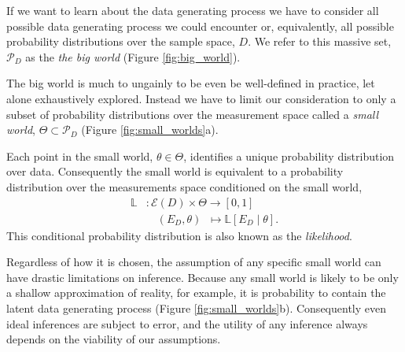 \documentclass[11pt, oneside]{article}
\newcommand{\PP}{ \mathbb{P} }
\newcommand{\EV}[1]{\ensuremath { \mathcal{E} \! \left( #1 \right)  } }
\begin{document}
If we want to learn about the data generating process we have
to consider all possible data generating process we could
encounter or, equivalently, all possible probability distributions
over the sample space, $D$.  We refer to this massive set, $\mathcal{P}_{D}$
as the \emph{the big world} (Figure \ref{fig:big_world}).  

\begin{figure*}
\centering
{}
\caption{Once we have defined a measurement space, $D$, the latent data
generating process, $\PP_{D}$ can be found in the space of all possible
data generating processes over $D$, $\mathcal{P}_{D}$.
}
\label{fig:big_world}
\end{figure*}

The big world is much to ungainly to be even be well-defined in practice, 
let alone exhaustively explored.  Instead we have to limit our consideration 
to only a subset of probability distributions over the measurement space 
called a \emph{small world}, $\Theta \subset \mathcal{P}_{D}$ 
(Figure \ref{fig:small_worlds}a).

Each point in the small world, $\theta \in \Theta$, identifies a unique 
probability distribution over data.  Consequently the small world is 
equivalent to a probability distribution over the measurements space
conditioned on the small world,
%
\begin{align*}
\mathbb{L}
&: \EV{D} \times \Theta \rightarrow \left[0, 1 \right] \\
&\quad \left( E_{D}, \theta \right) \;\; \mapsto 
\mathbb{L} \! \left[ E_{D} \mid \theta \right].
\end{align*}
%
This conditional probability distribution is also known as the 
\emph{likelihood}.

Regardless of how it is chosen, the assumption of any specific 
small world can have drastic limitations on inference.  Because any
small world is likely to be only a shallow approximation of reality,
for example, it is probability to contain the latent data generating
process (Figure \ref{fig:small_worlds}b).  Consequently even ideal
inferences are subject to error, and the utility of any inference
always depends on the viability of our assumptions.
\end{document}
